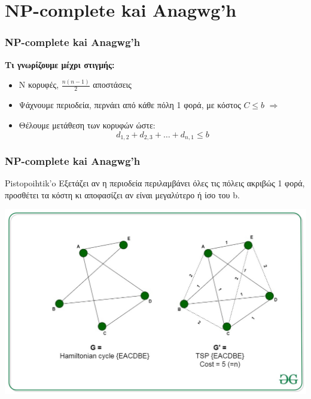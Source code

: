\documentclass{beamer}
\begin{document}
\section{\textlatin{NP-complete} kai Anagwg'h}
\begin{frame}\frametitle{\textlatin{NP-complete} kai Anagwg'h}
\begin{center}
\textbf{Τι γνωρίζουμε μέχρι στιγμής:}
\end{center}

\begin{itemize}
    \item N κορυφές, $\frac{n(n-1)}{2}$ αποστάσεις
    \item Ψάχνουμε περιοδεία, περνάει από κάθε πόλη 1 φορά, με κόστος $C \leq b$ $\Rightarrow$
    \item Θέλουμε μετάθεση των κορυφών ώστε:
    $$d_{1,2} + d_{2,3} + \ldots + d_{n,1} \leq b$$
\end{itemize}
\end{frame}

\begin{frame}\frametitle{\textlatin{NP-complete} kai Anagwg'h}
 \begin{block}{Pistopoihtik'o}
 Εξετάζει αν η περιοδεία περιλαμβάνει όλες τις πόλεις ακριβώς 1 φορά, προσθέτει τα κόστη κι αποφασίζει αν είναι μεγαλύτερο ή ίσο του \textlatin{b}.
 \end{block}

\end{frame}

\begin{frame}
    \begin{center}
    \includegraphics[width=\textwidth]{tsp1.jpg}
\end{center}
\end{frame}
\end{document}
